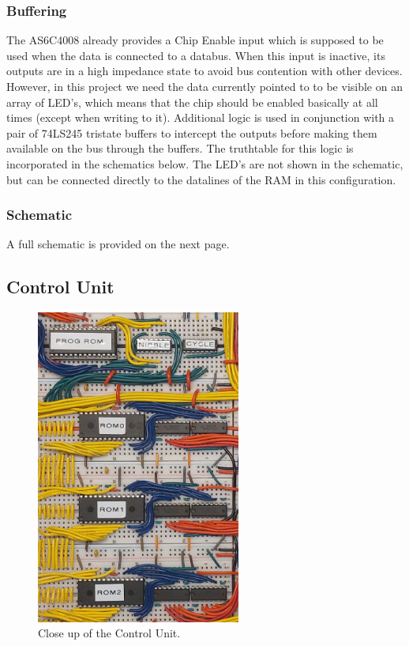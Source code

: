 \subsubsection{Buffering}
The AS6C4008 already provides a Chip Enable input which is supposed to be used when the data is connected to a databus. When this input is inactive, its outputs are in a high impedance state to avoid bus contention with other devices. However, in this project we need the data currently pointed to to be visible on an array of LED's, which means that the chip should be enabled basically at all times (except when writing to it). Additional logic is used in conjunction with a pair of 74LS245 tristate buffers to intercept the outputs before making them available on the bus through the buffers. The truthtable for this logic is incorporated in the schematics below. The LED's are not shown in the schematic, but can be connected directly to the datalines of the RAM in this configuration. 

\subsubsection{Schematic}
A full schematic is provided on the next page.




\subsection{Control Unit}\label{sec:implementation:cu}
\begin{figure}[H]
  \centering
  \includegraphics[width=0.6\textwidth]{img/controlunitcloseup}
  \caption{Close up of the Control Unit.}
  \label{fig:controlunitcloseup}
\end{figure}


